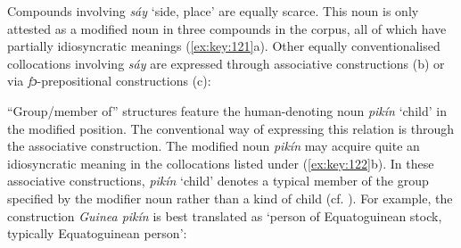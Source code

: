 Compounds involving \textit{sáy} ‘side, place’ are equally scarce. This noun is only attested as a modified noun in three compounds in the corpus, all of which have partially idiosyncratic meanings (\ref{ex:key:121}a). Other equally conventionalised collocations involving \textit{sáy} are expressed through associative constructions (b) or via \textit{fɔ}{}-prepositional constructions (c):

“Group/member of” structures feature the human-denoting noun \textit{pikín} ‘child’ in the modified position. The conventional way of expressing this relation is through the associative construction. The modified noun \textit{pikín} may acquire quite an idiosyncratic meaning in the collocations listed under (\ref{ex:key:122}b). In these associative constructions, \textit{pikín} ‘child’ denotes a typical member of the group specified by the modifier noun rather than a kind of child (cf. \citealt[91–97]{ClaudiHünnemeyer1991}). For example, the construction \textit{Guinea pikín} is best translated as ‘person of Equatoguinean stock, typically Equatoguinean person’: 

